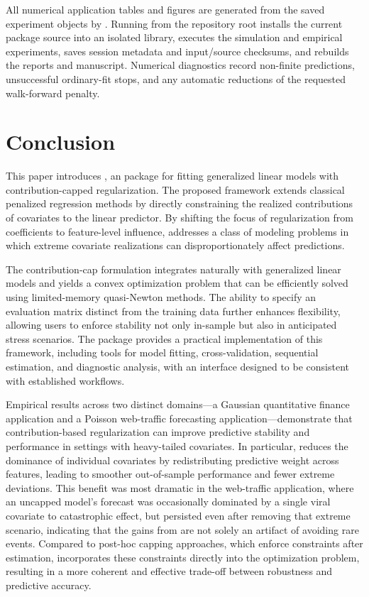 \documentclass[article,shortnames,nofooter]{jss}
\begin{document}
All numerical application tables and figures are generated from the saved experiment objects by . Running  from the repository root installs the current package source into an isolated library, executes the simulation and empirical experiments, saves session metadata and input/source checksums, and rebuilds the reports and manuscript. Numerical diagnostics record non-finite predictions, unsuccessful ordinary-fit stops, and any automatic reductions of the requested walk-forward penalty.

\clearpage
\section{Conclusion}\label{sec:conclusion}

This paper introduces , an  package for fitting generalized linear models with contribution-capped regularization. The proposed framework extends classical penalized regression methods by directly constraining the realized contributions of covariates to the linear predictor. By shifting the focus of regularization from coefficients to feature-level influence,  addresses a class of modeling problems in which extreme covariate realizations can disproportionately affect predictions.

The contribution-cap formulation integrates naturally with generalized linear models and yields a convex optimization problem that can be efficiently solved using limited-memory quasi-Newton methods. The ability to specify an evaluation matrix distinct from the training data further enhances flexibility, allowing users to enforce stability not only in-sample but also in anticipated stress scenarios. The package provides a practical implementation of this framework, including tools for model fitting, cross-validation, sequential estimation, and diagnostic analysis, with an interface designed to be consistent with established workflows.

Empirical results across two distinct domains---a Gaussian quantitative finance application and a Poisson web-traffic forecasting application---demonstrate that contribution-based regularization can improve predictive stability and performance in settings with heavy-tailed covariates. In particular,  reduces the dominance of individual covariates by redistributing predictive weight across features, leading to smoother out-of-sample performance and fewer extreme deviations. This benefit was most dramatic in the web-traffic application, where an uncapped model's forecast was occasionally dominated by a single viral covariate to catastrophic effect, but persisted even after removing that extreme scenario, indicating that the gains from  are not solely an artifact of avoiding rare events. Compared to post-hoc capping approaches, which enforce constraints after estimation,  incorporates these constraints directly into the optimization problem, resulting in a more coherent and effective trade-off between robustness and predictive accuracy.
\end{document}

